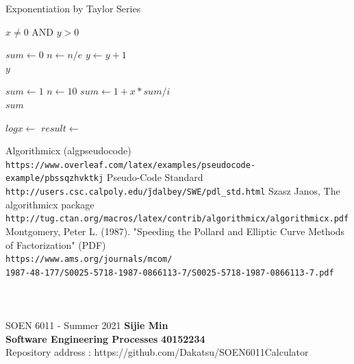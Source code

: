 \documentclass[letterpaper, 11pt]{report}
\begin{document}
\begin{algorithm}
\caption{Exponentiation by Taylor Series}\label{exp1}
\begin{algorithmic}[1]
\Require $x \neq 0$ AND $y > 0$

\State $sum\gets 0$
    \State $n\gets n/e$
    \State $y \gets y+1 $
\EndWhile \\
\Return $y$
\EndFunction

\State $sum\gets 1$
\State $n\gets 10$
\State $sum\gets 1+ x * sum / i$
\EndFor \\
\Return $sum$
\EndFunction

\State $logx \gets $
\State $result \gets $
\end{algorithmic}
\end{algorithm}

\begin{thebibliography}{}
Algorithmicx (algpseudocode)
\\\texttt{https://www.overleaf.com/latex/examples/pseudocode-example/pbssqzhvktkj}
Pseudo-Code Standard
\\\texttt{http://users.csc.calpoly.edu/\~jdalbey/SWE/pdl\_std.html}
Szasz Janos, The algorithmicx package
\\\texttt{http://tug.ctan.org/macros/latex/contrib/algorithmicx/algorithmicx.pdf}
 Montgomery, Peter L. (1987). "Speeding the Pollard and Elliptic Curve Methods of Factorization" (PDF)
\\\texttt{https://www.ams.org/journals/mcom/\\1987-48-177/S0025-5718-1987-0866113-7/S0025-5718-1987-0866113-7.pdf}
\end{thebibliography}
\pagebreak

\section*{}
\\


\normalsize {SOEN 6011 - Summer 2021} \hfill \textbf{Sijie Min} \\
\textbf{ Software Engineering Processes}  \hfill \textbf{40152234} \\
\hfill Repository address : https://github.com/Dakatsu/SOEN6011Calculator
\\\\\\\\\\
\end{document}
